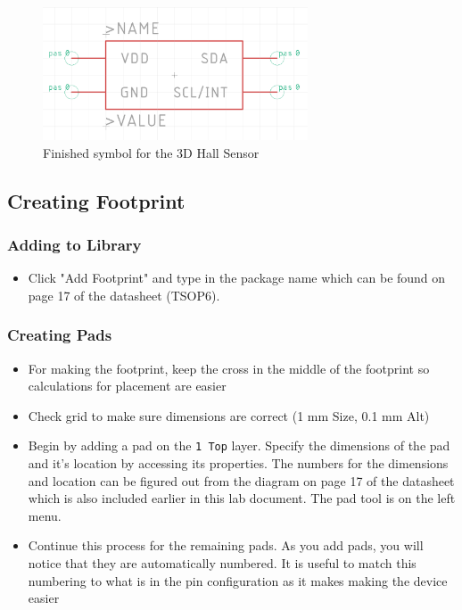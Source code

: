 \documentclass{article}
\begin{document}
\begin{figure}[h]
    \center
	\includegraphics[width=0.7\textwidth, keepaspectratio]{images/symbol.png}
	\caption{Finished symbol for the 3D Hall Sensor}
	\label{fig:symbol}
\end{figure}


\subsection{Creating Footprint}
\subsubsection{Adding to Library}
\begin{itemize}
    \item Click "Add Footprint" and type in the package name which can be found on page 17 of the datasheet (TSOP6).
\end{itemize}
\subsubsection{Creating Pads}
\begin{itemize}
    \item For making the footprint, keep the cross in the middle of the footprint so calculations for placement are easier
    \item Check grid to make sure dimensions are correct (1 mm Size, 0.1 mm Alt)
    \item Begin by adding a pad on the \texttt{1 Top} layer. Specify the dimensions of the pad and it's location by accessing its properties. The numbers for the dimensions and location can be figured out from the diagram on page 17 of the datasheet which is also included earlier in this lab document. The pad tool is on the left menu.
    \item Continue this process for the remaining pads. As you add pads, you will notice that they are automatically numbered. It is useful to match this numbering to what is in the pin configuration as it makes making the device easier
\end{itemize}
\end{document}
